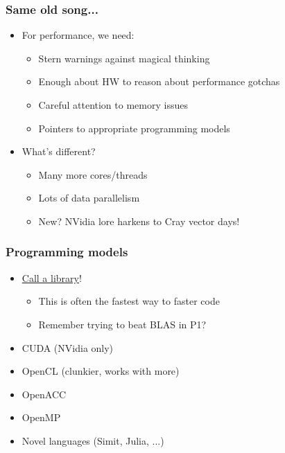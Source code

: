 \documentclass{beamer}
\begin{document}
\begin{frame}
  \frametitle{Same old song...}

  \begin{itemize}
  \item For performance, we need:
    \begin{itemize}
    \item Stern warnings against magical thinking
    \item Enough about HW to reason about performance gotchas
    \item Careful attention to memory issues
    \item Pointers to appropriate programming models
    \end{itemize}
  \item What's different?
    \begin{itemize}
    \item Many more cores/threads
    \item Lots of data parallelism
    \item New? NVidia lore harkens to Cray vector days!
    \end{itemize}
  \end{itemize}
\end{frame}


\begin{frame}
  \frametitle{Programming models}

  \begin{itemize}
  \item \href{https://developer.nvidia.com/gpu-accelerated-libraries}{Call
      a library}!
    \begin{itemize}
    \item This is often the fastest way to faster code
    \item Remember trying to beat BLAS in P1?
    \end{itemize}
  \item CUDA (NVidia only)
  \item OpenCL (clunkier, works with more)
  \item OpenACC
  \item OpenMP
  \item Novel languages (Simit, Julia, ...)
  \end{itemize}
\end{frame}
\end{document}
